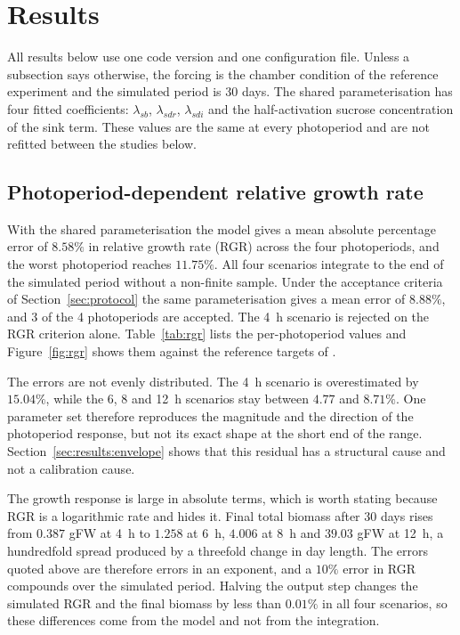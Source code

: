 
\section{Results}
\label{sec:results}

All results below use one code version and one configuration file. Unless a
subsection says otherwise, the forcing is the chamber condition of the
reference experiment and the simulated period is 30 days. The shared
parameterisation has four fitted coefficients: $\lambda_{sb}$,
$\lambda_{sdr}$, $\lambda_{sdi}$ and the half-activation sucrose concentration
of the sink term. These values are the same at every photoperiod and are not
refitted between the studies below.

\subsection{Photoperiod-dependent relative growth rate}
\label{sec:results:rgr}

With the shared parameterisation the model gives a mean absolute percentage
error of $8.58\%$ in relative growth rate (RGR) across the four photoperiods,
and the worst photoperiod reaches $11.75\%$. All four scenarios integrate to
the end of the simulated period without a non-finite sample. Under the
acceptance criteria of Section~\ref{sec:protocol} the same parameterisation
gives a mean error of $8.88\%$, and 3 of the 4 photoperiods are accepted. The
4~h scenario is rejected on the RGR criterion alone. Table~\ref{tab:rgr} lists
the per-photoperiod values and Figure~\ref{fig:rgr} shows them against the
reference targets of \citet{Sulpice2014}.

The errors are not evenly distributed. The 4~h scenario is overestimated by
$15.04\%$, while the 6, 8 and 12~h scenarios stay between $4.77$ and $8.71\%$.
One parameter set therefore reproduces the magnitude and the direction of the
photoperiod response, but not its exact shape at the short end of the range.
Section~\ref{sec:results:envelope} shows that this residual has a structural
cause and not a calibration cause.

The growth response is large in absolute terms, which is worth stating because
RGR is a logarithmic rate and hides it. Final total biomass after 30 days rises
from $0.387$ gFW at 4~h to $1.258$ at 6~h, $4.006$ at 8~h and $39.03$ gFW at
12~h, a hundredfold spread produced by a threefold change in day length. The
errors quoted above are therefore errors in an exponent, and a $10\%$ error in
RGR compounds over the simulated period. Halving the output step changes the
simulated RGR and the final biomass by less than $0.01\%$ in all four
scenarios, so these differences come from the model and not from the
integration.


